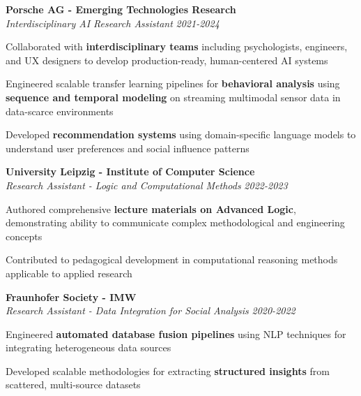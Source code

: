 \documentclass[margin,line]{resume}
\begin{document}
\begin{resume}
        \textbf{Porsche AG - Emerging Technologies Research}\\
        \textit{Interdisciplinary AI Research Assistant} \hfill \textsl{2021-2024}\\
        \begin{list2}\setlength\itemsep{0.75mm}
        \item Collaborated with \textbf{interdisciplinary teams} including psychologists, engineers, and UX designers to develop production-ready, human-centered AI systems
        \item Engineered scalable transfer learning pipelines for \textbf{behavioral analysis} using \textbf{sequence and temporal modeling} on streaming multimodal sensor data in data-scarce environments
        \item Developed \textbf{recommendation systems} using domain-specific language models to understand user preferences and social influence patterns
        \end{list2}

        \textbf{University Leipzig - Institute of Computer Science}\\
        \textit{Research Assistant - Logic and Computational Methods} \hfill \textsl{2022-2023}\\
        \begin{list2}\setlength\itemsep{0.75mm}
        \item Authored comprehensive \textbf{lecture materials on Advanced Logic}, demonstrating ability to communicate complex methodological and engineering concepts
        \item Contributed to pedagogical development in computational reasoning methods applicable to applied research
        \end{list2}

        \textbf{Fraunhofer Society - IMW}\\
        \textit{Research Assistant - Data Integration for Social Analysis} \hfill \textsl{2020-2022}\\
        \begin{list2}\setlength\itemsep{0.75mm}
        \item Engineered \textbf{automated database fusion pipelines} using NLP techniques for integrating heterogeneous data sources
        \item Developed scalable methodologies for extracting \textbf{structured insights} from scattered, multi-source datasets
        \end{list2}


\end{resume}
\end{document}
